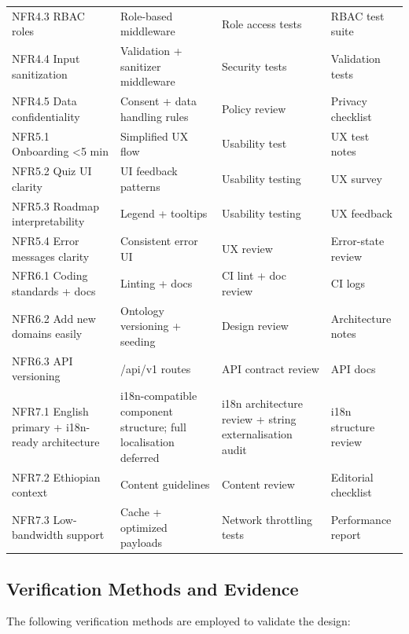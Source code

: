 \begin{longtable}{p{3cm}p{3.5cm}p{3cm}p{4.5cm}}
NFR4.3 RBAC roles & Role-based middleware & Role access tests & RBAC test suite \\
NFR4.4 Input sanitization & Validation + sanitizer middleware & Security tests & Validation tests \\
NFR4.5 Data confidentiality & Consent + data handling rules & Policy review & Privacy checklist \\
NFR5.1 Onboarding <5 min & Simplified UX flow & Usability test & UX test notes \\
NFR5.2 Quiz UI clarity & UI feedback patterns & Usability testing & UX survey \\
NFR5.3 Roadmap interpretability & Legend + tooltips & Usability testing & UX feedback \\
NFR5.4 Error messages clarity & Consistent error UI & UX review & Error-state review \\
NFR6.1 Coding standards + docs & Linting + docs & CI lint + doc review & CI logs \\
NFR6.2 Add new domains easily & Ontology versioning + seeding & Design review & Architecture notes \\
NFR6.3 API versioning & /api/v1 routes & API contract review & API docs \\
NFR7.1 English primary + i18n-ready architecture & i18n-compatible component structure; full localisation deferred & i18n architecture review + string externalisation audit & i18n structure review \\
NFR7.2 Ethiopian context & Content guidelines & Content review & Editorial checklist \\
NFR7.3 Low-bandwidth support & Cache + optimized payloads & Network throttling tests & Performance report \\
\bottomrule
\end{longtable}

\subsection{Verification Methods and Evidence}

The following verification methods are employed to validate the design:

